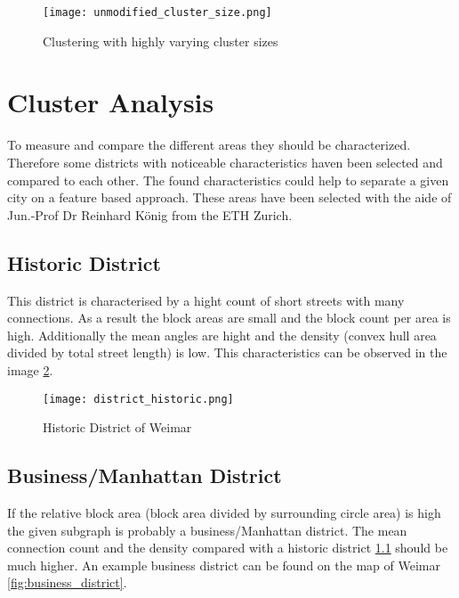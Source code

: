 \begin{figure}
    \centering
    \begin{mdframed}[style=mdthight, userdefinedwidth=0.5\linewidth, align=center]
        \texttt{[image: unmodified\_cluster\_size.png]}
    \end{mdframed}
    \caption{Clustering with highly varying cluster sizes}
    \label{fig:problem_unmodified_cluster_size}
\end{figure}

\pagebreak
\section{Cluster Analysis}
\label{sec:concept_cluster_analysis}
To measure and compare the different areas they should be characterized. Therefore some districts with noticeable characteristics haven been selected and compared to each other. The found characteristics could help to separate a given city on a feature based approach.
These areas have been selected with the aide of Jun.-Prof Dr Reinhard König from the ETH Zurich.

\subsection{Historic District}
\label{sec:historyDistinct}
This district is characterised by a hight count of short streets with many connections. As a result the block areas are small and the block count per area is high. Additionally the mean angles are hight and the density (convex hull area divided by total street length) is low. This characteristics can be observed in the image \ref{fig:historic_district}.

\begin{figure}[!ht]
    \centering
    \begin{mdframed}[style=mdthight, userdefinedwidth=0.4\textwidth, align=center]
        \texttt{[image: district\_historic.png]}
    \end{mdframed}
    \caption{Historic District of Weimar}
    \label{fig:historic_district}
\end{figure}

\FloatBarrier
\subsection{Business/Manhattan District} 
\label{sec:businessDistinct}
If the relative block area (block area divided by surrounding circle area) is high the given subgraph is probably a business/Manhattan district. The mean connection count and the density compared with a historic district \ref{sec:historyDistinct} should be much higher. An example business district can be found on the map of Weimar \ref{fig:business_district}.

